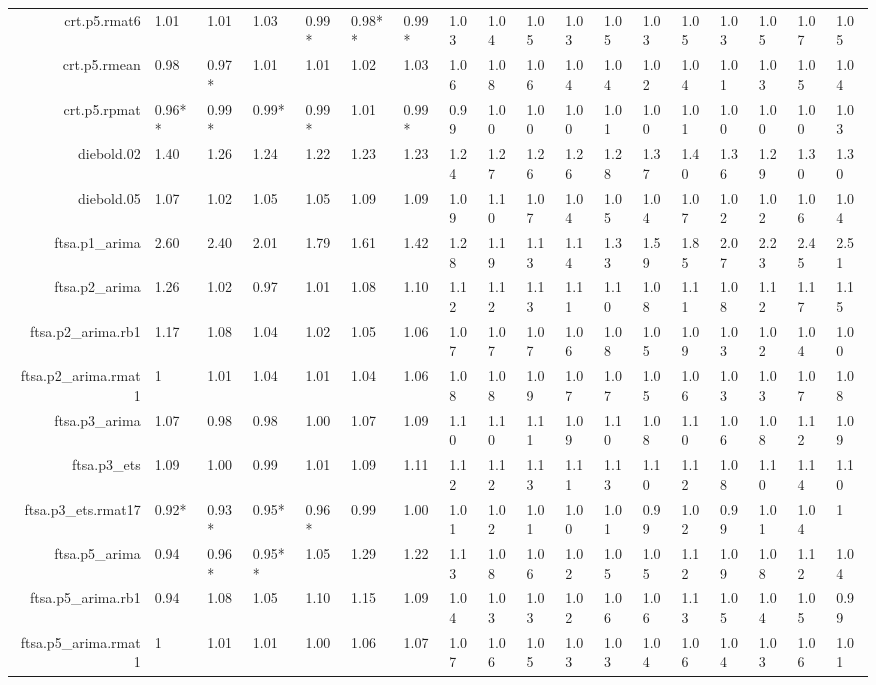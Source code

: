 \begin{table}[ht]
{\begin{tabular}{rlllllllllllllllll}
  crt.p5.rmat6 & 1.01 & 1.01 & 1.03 & 0.99* & 0.98** & 0.99* & 1.03 & 1.04 & 1.05 & 1.03 & 1.05 & 1.03 & 1.05 & 1.03 & 1.05 & 1.07 & 1.05 \\ 
  crt.p5.rmean & 0.98 & 0.97* & 1.01 & 1.01 & 1.02 & 1.03 & 1.06 & 1.08 & 1.06 & 1.04 & 1.04 & 1.02 & 1.04 & 1.01 & 1.03 & 1.05 & 1.04 \\ 
  crt.p5.rpmat & 0.96** & 0.99* & 0.99* & 0.99* & 1.01 & 0.99* & 0.99 & 1.00 & 1.00 & 1.00 & 1.01 & 1.00 & 1.01 & 1.00 & 1.00 & 1.00 & 1.03 \\ 
  diebold.02 & 1.40 & 1.26 & 1.24 & 1.22 & 1.23 & 1.23 & 1.24 & 1.27 & 1.26 & 1.26 & 1.28 & 1.37 & 1.40 & 1.36 & 1.29 & 1.30 & 1.30 \\ 
  diebold.05 & 1.07 & 1.02 & 1.05 & 1.05 & 1.09 & 1.09 & 1.09 & 1.10 & 1.07 & 1.04 & 1.05 & 1.04 & 1.07 & 1.02 & 1.02 & 1.06 & 1.04 \\ 
  ftsa.p1\_arima & 2.60 & 2.40 & 2.01 & 1.79 & 1.61 & 1.42 & 1.28 & 1.19 & 1.13 & 1.14 & 1.33 & 1.59 & 1.85 & 2.07 & 2.23 & 2.45 & 2.51 \\ 
  ftsa.p2\_arima & 1.26 & 1.02 & 0.97 & 1.01 & 1.08 & 1.10 & 1.12 & 1.12 & 1.13 & 1.11 & 1.10 & 1.08 & 1.11 & 1.08 & 1.12 & 1.17 & 1.15 \\ 
  ftsa.p2\_arima.rb1 & 1.17 & 1.08 & 1.04 & 1.02 & 1.05 & 1.06 & 1.07 & 1.07 & 1.07 & 1.06 & 1.08 & 1.05 & 1.09 & 1.03 & 1.02 & 1.04 & 1.00 \\ 
  ftsa.p2\_arima.rmat1 & 1 & 1.01 & 1.04 & 1.01 & 1.04 & 1.06 & 1.08 & 1.08 & 1.09 & 1.07 & 1.07 & 1.05 & 1.06 & 1.03 & 1.03 & 1.07 & 1.08 \\ 
  ftsa.p3\_arima & 1.07 & 0.98 & 0.98 & 1.00 & 1.07 & 1.09 & 1.10 & 1.10 & 1.11 & 1.09 & 1.10 & 1.08 & 1.10 & 1.06 & 1.08 & 1.12 & 1.09 \\ 
  ftsa.p3\_ets & 1.09 & 1.00 & 0.99 & 1.01 & 1.09 & 1.11 & 1.12 & 1.12 & 1.13 & 1.11 & 1.13 & 1.10 & 1.12 & 1.08 & 1.10 & 1.14 & 1.10 \\ 
  ftsa.p3\_ets.rmat17 & 0.92* & 0.93* & 0.95* & 0.96* & 0.99 & 1.00 & 1.01 & 1.02 & 1.01 & 1.00 & 1.01 & 0.99 & 1.02 & 0.99 & 1.01 & 1.04 & 1 \\ 
  ftsa.p5\_arima & 0.94 & 0.96* & 0.95** & 1.05 & 1.29 & 1.22 & 1.13 & 1.08 & 1.06 & 1.02 & 1.05 & 1.05 & 1.12 & 1.09 & 1.08 & 1.12 & 1.04 \\ 
  ftsa.p5\_arima.rb1 & 0.94 & 1.08 & 1.05 & 1.10 & 1.15 & 1.09 & 1.04 & 1.03 & 1.03 & 1.02 & 1.06 & 1.06 & 1.13 & 1.05 & 1.04 & 1.05 & 0.99 \\ 
  ftsa.p5\_arima.rmat1 & 1 & 1.01 & 1.01 & 1.00 & 1.06 & 1.07 & 1.07 & 1.06 & 1.05 & 1.03 & 1.03 & 1.04 & 1.06 & 1.04 & 1.03 & 1.06 & 1.01 \\ 

\end{tabular}}
\end{table}
